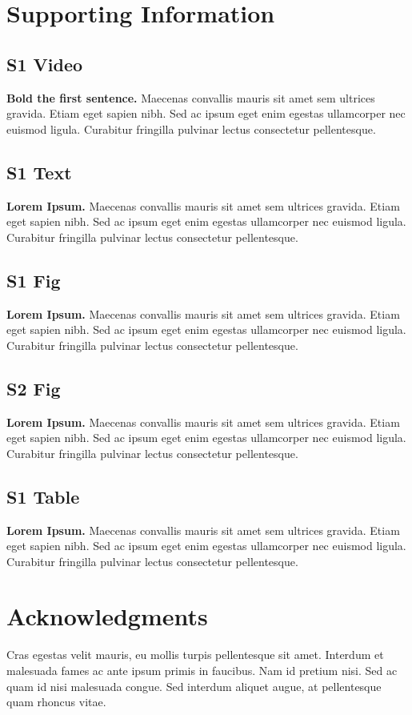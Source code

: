 \documentclass[10pt,letterpaper]{article}
\begin{document}
\section*{Supporting Information}

\subsection*{S1 Video}
\label{S1_Video}
{\bf Bold the first sentence.}  Maecenas convallis mauris sit amet sem ultrices gravida. Etiam eget sapien nibh. Sed ac ipsum eget enim egestas ullamcorper nec euismod ligula. Curabitur fringilla pulvinar lectus consectetur pellentesque.

\subsection*{S1 Text}
\label{S1_Text}
{\bf Lorem Ipsum.} Maecenas convallis mauris sit amet sem ultrices gravida. Etiam eget sapien nibh. Sed ac ipsum eget enim egestas ullamcorper nec euismod ligula. Curabitur fringilla pulvinar lectus consectetur pellentesque.

\subsection*{S1 Fig}
\label{S1_Fig}
{\bf Lorem Ipsum.} Maecenas convallis mauris sit amet sem ultrices gravida. Etiam eget sapien nibh. Sed ac ipsum eget enim egestas ullamcorper nec euismod ligula. Curabitur fringilla pulvinar lectus consectetur pellentesque.

\subsection*{S2 Fig}
\label{S2_Fig}
{\bf Lorem Ipsum.} Maecenas convallis mauris sit amet sem ultrices gravida. Etiam eget sapien nibh. Sed ac ipsum eget enim egestas ullamcorper nec euismod ligula. Curabitur fringilla pulvinar lectus consectetur pellentesque.

\subsection*{S1 Table}
\label{S1_Table}
{\bf Lorem Ipsum.} Maecenas convallis mauris sit amet sem ultrices gravida. Etiam eget sapien nibh. Sed ac ipsum eget enim egestas ullamcorper nec euismod ligula. Curabitur fringilla pulvinar lectus consectetur pellentesque.

\section*{Acknowledgments}
Cras egestas velit mauris, eu mollis turpis pellentesque sit amet. Interdum et malesuada fames ac ante ipsum primis in faucibus. Nam id pretium nisi. Sed ac quam id nisi malesuada congue. Sed interdum aliquet augue, at pellentesque quam rhoncus vitae.

\nolinenumbers




\end{document}
